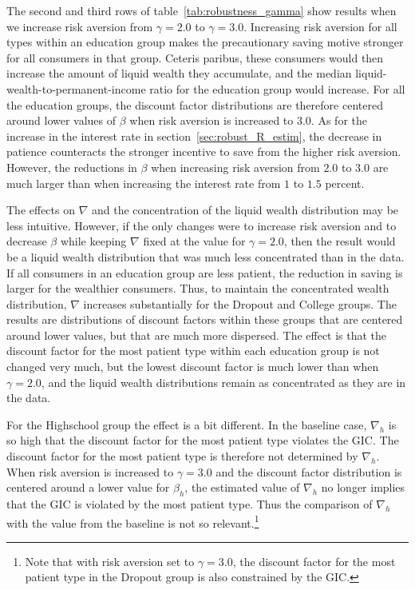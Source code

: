 \documentclass[\latexroot/\projectname]{subfiles}
\begin{document}
The second and third rows of table~\ref{tab:robustness_gamma} show results when we increase risk aversion from $\gamma=2.0$ to $\gamma=3.0$.
Increasing risk aversion for all types within an education group makes the precautionary saving motive stronger for all consumers in that group.
Ceteris paribus, these consumers would then increase the amount of liquid wealth they accumulate, and the median liquid-wealth-to-permanent-income ratio for the education group would increase.
For all the education groups, the discount factor distributions are therefore centered around lower values of $\beta$ when risk aversion is increased to $3.0$.
As for the increase in the interest rate in section~\ref{sec:robust_R_estim}, the decrease in patience counteracts the stronger incentive to save from the higher risk aversion.
However, the reductions in $\beta$ when increasing risk aversion from $2.0$ to $3.0$ are much larger than when increasing the interest rate from $1$ to $1.5$ percent.

The effects on $\nabla$ and the concentration of the liquid wealth distribution may be less intuitive.
However, if the only changes were to increase risk aversion and to decrease $\beta$ while keeping $\nabla$ fixed at the value for $\gamma=2.0$, then the result would be a liquid wealth distribution that was much less concentrated than in the data.
If all consumers in an education group are less patient, the reduction in saving is larger for the wealthier consumers.
Thus, to maintain the concentrated wealth distribution, $\nabla$ increases substantially for the Dropout and College groups.
The results are distributions of discount factors within these groups that are centered around lower values, but that are much more dispersed.
The effect is that the discount factor for the most patient type within each education group is not changed very much, but the lowest discount factor is much lower than when $\gamma=2.0$, and the liquid wealth distributions remain as concentrated as they are in the data.

For the Highschool group the effect is a bit different.
In the baseline case, $\nabla_h$ is so high that the discount factor for the most patient type violates the GIC.
The discount factor for the most patient type is therefore not determined by $\nabla_h$.
When risk aversion is increased to $\gamma=3.0$ and the discount factor distribution is centered around a lower value for $\beta_h$, the estimated value of $\nabla_h$ no longer implies that the GIC is violated by the most patient type.
Thus the comparison of $\nabla_h$ with the value from the baseline is not so relevant.\footnote{Note that with risk aversion set to $\gamma=3.0$, the discount factor for the most patient type in the Dropout group is also constrained by the GIC.}
\end{document}
